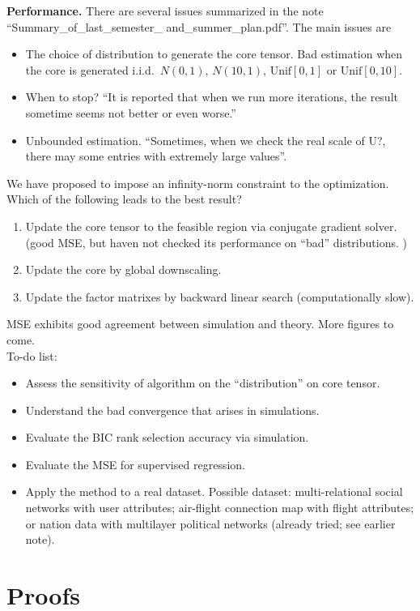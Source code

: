 \documentclass[11pt]{article}
\theoremstyle{plain}
\theoremstyle{definition}
\begin{document}
{\bf Performance.} There are several issues summarized in the note ``Summary\_of\_last\_semester\_
and\_summer\_plan.pdf''. The main issues are
\begin{itemize}
\item The choice of distribution to generate the core tensor. Bad estimation when the core is generated i.i.d.\ $N(0,1)$, $N(10,1)$, $\text{Unif}[0,1]$ or $\text{Unif}[0,10]$.
\item When to stop? ``It is reported that when we run more iterations, the result sometime seems not better or even worse.''
\item Unbounded estimation. ``Sometimes, when we check the real scale of U?, there may some entries with extremely large values''.
\end{itemize}
We have proposed to impose an infinity-norm constraint to the optimization. Which of the following leads to the best result?
\begin{enumerate}
\item Update the core tensor to the feasible region via conjugate gradient solver. (good MSE, but haven not checked its performance on ``bad'' distributions. )
\item Update the core by global downscaling.
\item Update the factor matrixes by backward linear search (computationally slow).
\end{enumerate}


MSE exhibits good agreement between simulation and theory. More figures to come.\\
To-do list:
\begin{itemize}
\item Assess the sensitivity of algorithm on the ``distribution'' on core tensor. 
\item Understand the bad convergence that arises in simulations.  
\item Evaluate the BIC rank selection accuracy via simulation.
\item Evaluate the MSE for supervised regression.
\item Apply the method to a real dataset. Possible dataset: multi-relational social networks with user attributes; air-flight connection map with flight attributes; or nation data with multilayer political networks (already tried; see earlier note). 
\end{itemize}
\section{Proofs}
\end{document}
